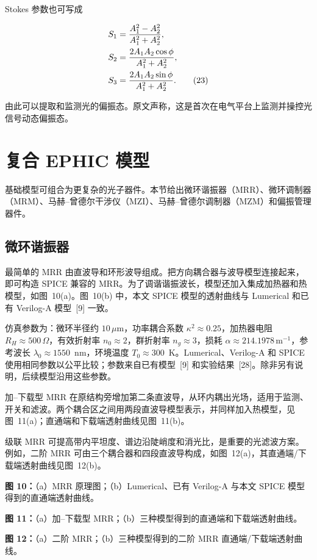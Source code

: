 \documentclass[11pt,a4paper]{ctexart}
\begin{document}
Stokes 参数也可写成

\begin{align}
S_1&=\frac{A_1^2-A_2^2}{A_1^2+A_2^2},\notag\\
S_2&=\frac{2A_1A_2\cos\phi}{A_1^2+A_2^2},\notag\\
S_3&=\frac{2A_1A_2\sin\phi}{A_1^2+A_2^2}.
\tag{23}
\end{align}

由此可以提取和监测光的偏振态。原文声称，这是首次在电气平台上监测并操控光信号动态偏振态。

\section{复合 EPHIC 模型}

基础模型可组合为更复杂的光子器件。本节给出微环谐振器（MRR）、微环调制器（MRM）、马赫--曾德尔干涉仪（MZI）、马赫--曾德尔调制器（MZM）和偏振管理器件。

\subsection{微环谐振器}

最简单的 MRR 由直波导和环形波导组成。把方向耦合器与波导模型连接起来，即可构造 SPICE 兼容的 MRR。为了调谐谐振波长，模型还加入集成加热器和热模型，如图~10(a)。图~10(b) 中，本文 SPICE 模型的透射曲线与 Lumerical 和已有 Verilog-A 模型~[9] 一致。

仿真参数为：微环半径约 $10\,\mu\mathrm{m}$，功率耦合系数 $\kappa^2\approx0.25$，加热器电阻 $R_H\approx500\,\Omega$，有效折射率 $n_0\approx2$，群折射率 $n_g\approx3$，损耗 $\alpha\approx214.1978\,\mathrm{m}^{-1}$，参考波长 $\lambda_0\approx1550$~nm，环境温度 $T_0\approx300$~K。Lumerical、Verilog-A 和 SPICE 使用相同参数以公平比较；参数来自已有模型~[9] 和实验结果~[28]。除非另有说明，后续模型沿用这些参数。

加--下载型 MRR 在原结构旁增加第二条直波导，从环内耦出光场，适用于监测、开关和滤波。两个耦合区之间用两段直波导模型表示，并同样加入热模型，见图~11(a)；直通端和下载端透射曲线见图~11(b)。

级联 MRR 可提高带内平坦度、谱边沿陡峭度和消光比，是重要的光滤波方案。例如，二阶 MRR 可由三个耦合器和四段直波导构成，如图~12(a)，其直通端/下载端透射曲线见图~12(b)。

\noindent\textbf{图 10：}（a）MRR 原理图；（b）Lumerical、已有 Verilog-A 与本文 SPICE 模型得到的直通端透射曲线。\par
\noindent\textbf{图 11：}（a）加--下载型 MRR；（b）三种模型得到的直通端和下载端透射曲线。\par
\noindent\textbf{图 12：}（a）二阶 MRR；（b）三种模型得到的二阶 MRR 直通端/下载端透射曲线。
\end{document}
